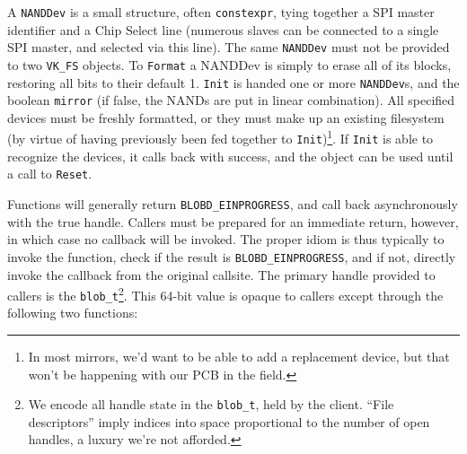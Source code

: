 \documentclass[letterpaper,10pt]{article}
\begin{document}
A {\texttt{NANDDev}} is a small structure, often {\texttt{constexpr}}, tying
together a SPI master identifier and a Chip Select line (numerous slaves can be
connected to a single SPI master, and selected via this line). The same {\texttt{NANDDev}}
must not be provided to two {\texttt{VK\_FS}} objects. To {\texttt{Format}} a
NANDDev is simply to erase all of its blocks, restoring all bits to their default
1. {\texttt{Init}} is handed one or more {\texttt{NANDDev}}s, and the boolean
{\texttt{mirror}} (if false, the NANDs are put in linear combination). All
specified devices must be freshly formatted, or they must make up an existing
filesystem (by virtue of having previously been fed together to
{\texttt{Init}})\footnote{In most mirrors, we'd want to be able to add a
  replacement device, but that won't be happening with our PCB in the field.}.
If {\texttt{Init}} is able to recognize the devices, it calls back with
success, and the object can be used until a call to {\texttt{Reset}}.

Functions will generally return {\texttt{BLOBD\_EINPROGRESS}}, and call back
asynchronously with the true handle. Callers must be prepared for an immediate
return, however, in which case no callback will be invoked. The proper idiom
is thus typically to invoke the function, check if the result is
{\texttt{BLOBD\_EINPROGRESS}}, and if not, directly invoke the callback
from the original callsite. The primary handle provided to callers is the
{\texttt{blob\_t}}\footnote{We encode all handle state in the \texttt{blob\_t},
  held by the client. ``File descriptors'' imply indices into space
  proportional to the number of open handles, a luxury we're not afforded.}.
This 64-bit value is opaque to callers except through the following two
functions:
\end{document}
